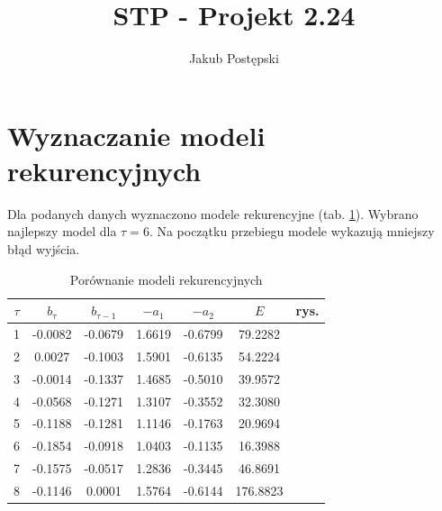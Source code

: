 \documentclass[a4paper, 10pt]{article}
\author{Jakub Postępski}
\title{STP - Projekt 2.24}
\begin{document}
	\maketitle
	\section{Wyznaczanie modeli rekurencyjnych}
	Dla podanych danych wyznaczono modele rekurencyjne (tab. \ref{tab:z1}). Wybrano najlepszy model dla $\tau=6$. Na początku przebiegu modele wykazują mniejszy błąd wyjścia. \\
	\begin{table}[H]
	\begin{tabular}{|c|c|c|c|c|c|c|}
	\hline 
	$\tau$ & $b_\tau$ & $b_{\tau-1}$ & $-a_1$ & $-a_2$ & $E$ & rys. \\ 
	\hline 
	 1 & -0.0082 & -0.0679 &  1.6619 & -0.6799
	  & 79.2282 & \\ 
	\hline 
	2 & 0.0027 & -0.1003
	  &  1.5901 & -0.6135 & 54.2224 & \\ 
	\hline 3 & -0.0014 & -0.1337 &  1.4685  & -0.5010 & 39.9572 & \\ 
	\hline 
	4 & -0.0568 & -0.1271 & 1.3107 & -0.3552
	  & 32.3080  &\\ 
	\hline 
 5 & -0.1188 & -0.1281 & 1.1146 &  -0.1763 & 20.9694 & \\ 
	\hline 
	6 & -0.1854  &  -0.0918 &  1.0403  & -0.1135 & 16.3988 & \\ 
	\hline 
	7 & -0.1575 & -0.0517  & 1.2836 & -0.3445  & 46.8691
	& \\ 
	\hline
	8 & -0.1146 & 0.0001  & 1.5764 & -0.6144 & 176.8823 & \\ 
	\hline 
	\end{tabular}
	\label{tab:z1}
	\caption{Porównanie modeli rekurencyjnych}
	\end{table}
	
\end{document}
